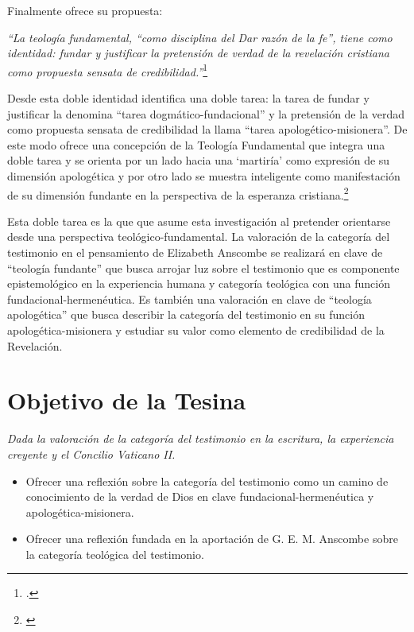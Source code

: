 \documentclass[11pt]{article}
\begin{document}
Finalmente ofrece su propuesta:

\emph{
``La teología fundamental, ``como disciplina del Dar razón de la fe'', tiene como identidad: fundar y justificar la pretensión de verdad de la revelación cristiana como propuesta sensata de credibilidad.''}\footcite[72]{ninotTF}

Desde esta doble identidad identifica una doble tarea: la tarea de fundar y justificar la denomina ``tarea dogmático-fundacional'' y la pretensión de la verdad como propuesta sensata de credibilidad la llama ``tarea apologético-misionera''. De este modo ofrece una concepción de la Teología Fundamental que integra una doble tarea y se orienta por un lado hacia una `martiría' como expresión de su dimensión apologética y por otro lado se muestra inteligente como manifestación de su dimensión fundante en la perspectiva de la esperanza cristiana.\footnote{\cite[72]{ninotTF}}

Esta doble tarea es la que que asume esta investigación al pretender orientarse desde una perspectiva teológico-fundamental. La valoración de la categoría del testimonio en el pensamiento de Elizabeth Anscombe se realizará en clave de ``teología fundante'' que busca arrojar luz sobre el testimonio que es componente epistemológico en la experiencia humana y categoría teológica con una función fundacional-hermenéutica. Es también una valoración en clave de ``teología apologética'' que busca describir la categoría del testimonio en su función apologética-misionera y estudiar su valor como elemento de credibilidad de la Revelación.


\printbibliography[title={Referencias usadas en la presentación:},keyword=pres]

\part*{Objetivo de la Tesina}

\emph{Dada la valoración de la categoría del testimonio en la escritura, la experiencia creyente y el Concilio Vaticano II.}
\begin{itemize}
  \item Ofrecer una reflexión sobre la categoría del testimonio como un camino de conocimiento de la verdad de Dios en clave fundacional-hermenéutica y apologética-misionera.
  \item Ofrecer una reflexión fundada en la aportación de G. E. M. Anscombe sobre la categoría teológica del testimonio.
\end{itemize}
\end{document}
